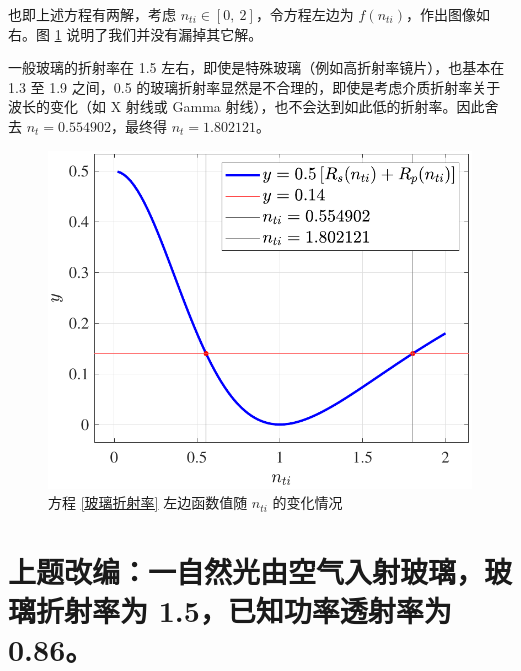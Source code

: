 \documentclass[UTF8]{report}
\theoremstyle{MyLineTheoremStyle} %
\theoremstyle{MyBlockTheoremStyle} %
\theoremstyle{MySubsubsectionStyle} %
\begin{document}
\begin{center}\noindent\begin{minipage}{0.50\textwidth}
\hspace*{2em} 也即上述方程有两解，考虑 $n_{ti} \in [0,\ 2]$，令方程左边为 $f(n_{ti})$，作出图像如右。图 \ref{方程左边的变化情况} 说明了我们并没有漏掉其它解。

\hspace*{2em} 一般玻璃的折射率在 1.5 左右，即使是特殊玻璃（例如高折射率镜片），也基本在 1.3 至 1.9 之间，0.5 的玻璃折射率显然是不合理的，即使是考虑介质折射率关于波长的变化（如 X 射线或 Gamma 射线），也不会达到如此低的折射率。因此舍去 $n_t = 0.554902$，最终得 $n_t = 1.802121$。
\end{minipage}\hfill\begin{minipage}{0.43\textwidth}
    \begin{figure}[H]\centering
        \includegraphics[width=\textwidth]{assets/2/2024-09-18_01-08-40.pdf}
        \vspace*{-9mm}
        \caption{ 方程 \ref{玻璃折射率} 左边函数值随 $n_{ti}$ 的变化情况}\label{方程左边的变化情况}
        \end{figure}
\end{minipage}\end{center}



\section*{上题改编：一自然光由空气入射玻璃，玻璃折射率为 1.5，已知功率透射率为 0.86。}
\end{document}
